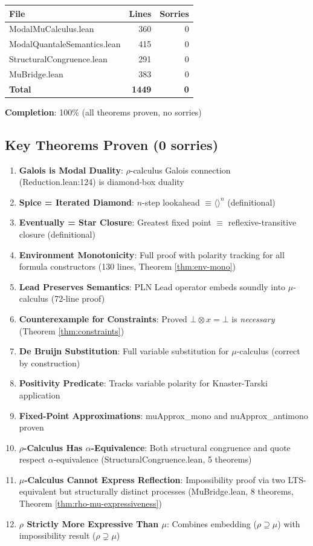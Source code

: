 \documentclass[11pt]{article}
\begin{document}
\begin{center}
\begin{tabular}{lrr}
\hline
\textbf{File} & \textbf{Lines} & \textbf{Sorries} \\
\hline
ModalMuCalculus.lean & 360 & 0 \\
ModalQuantaleSemantics.lean & 415 & 0 \\
StructuralCongruence.lean & 291 & 0 \\
MuBridge.lean & 383 & 0 \\
\hline
\textbf{Total} & \textbf{1449} & \textbf{0} \\
\hline
\end{tabular}
\end{center}

\textbf{Completion}: 100\% (all theorems proven, no sorries)

\subsection{Key Theorems Proven (0 sorries)}

\begin{enumerate}
\item \textbf{Galois is Modal Duality}: $\rho$-calculus Galois connection (Reduction.lean:124) is diamond-box duality
\item \textbf{Spice = Iterated Diamond}: $n$-step lookahead $\equiv \langle\rangle^n$ (definitional)
\item \textbf{Eventually = Star Closure}: Greatest fixed point $\equiv$ reflexive-transitive closure (definitional)
\item \textbf{Environment Monotonicity}: Full proof with polarity tracking for all formula constructors (130 lines, Theorem \ref{thm:env-mono})
\item \textbf{Lead Preserves Semantics}: PLN Lead operator embeds soundly into $\mu$-calculus (72-line proof)
\item \textbf{Counterexample for Constraints}: Proved $\bot \otimes x = \bot$ is \emph{necessary} (Theorem \ref{thm:constraints})
\item \textbf{De Bruijn Substitution}: Full variable substitution for $\mu$-calculus (correct by construction)
\item \textbf{Positivity Predicate}: Tracks variable polarity for Knaster-Tarski application
\item \textbf{Fixed-Point Approximations}: muApprox\_mono and nuApprox\_antimono proven
\item \textbf{$\rho$-Calculus Has $\alpha$-Equivalence}: Both structural congruence and quote respect $\alpha$-equivalence (StructuralCongruence.lean, 5 theorems)
\item \textbf{$\mu$-Calculus Cannot Express Reflection}: Impossibility proof via two LTS-equivalent but structurally distinct processes (MuBridge.lean, 8 theorems, Theorem \ref{thm:rho-mu-expressiveness})
\item \textbf{$\rho$ Strictly More Expressive Than $\mu$}: Combines embedding ($\rho \supseteq \mu$) with impossibility result ($\rho \supsetneq \mu$)
\end{enumerate}
\end{document}
